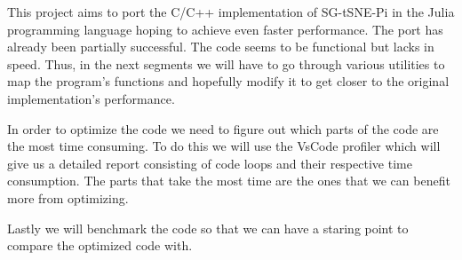 This project aims to port the C/C++ implementation of SG-tSNE-Pi in the Julia programming language hoping 
to achieve even faster performance. The port has already been partially successful. The code seems to be 
functional but lacks in speed. Thus, in the next segments we will have to go through various utilities to 
map the program's functions and hopefully modify it to get closer to the original implementation's performance.

In order to optimize the code we need to figure out which parts of the code are the most time consuming.
To do this we will use the VsCode profiler which will give us a detailed report consisting of code loops
and their respective time consumption. The parts that take the most time are the ones that we can benefit 
more from optimizing.

Lastly we will benchmark the code so that we can have a staring point to compare the optimized code with.
